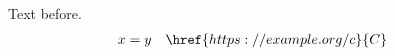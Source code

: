 \documentclass{article}
\begin{document}
Text before.
\begin{align}
x& = y && \href{https://example.org/c}{C}
\end{align}
\end{document}
